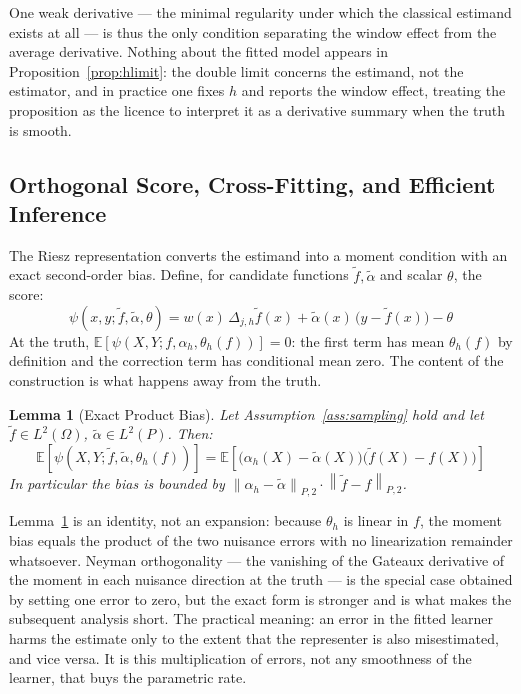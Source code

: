 \documentclass[12pt,a4paper]{article}
\numberwithin{equation}{section}
\theoremstyle{plain}
\newtheorem{lemma}{Lemma}
\theoremstyle{definition}
\newcommand{\norm}[1]{\left\| #1 \right\|}
\newcommand{\E}{\mathbb{E}}
\newcommand{\Dh}{\Delta_{j,h}}
\newcommand{\Ptwo}[1]{\norm{#1}_{P,2}}
\begin{document}
	One weak derivative --- the minimal regularity under which the classical estimand
	exists at all --- is thus the only condition separating the window effect from the
	average derivative. Nothing about the fitted model appears in
	Proposition~\ref{prop:hlimit}: the double limit concerns the estimand, not the
	estimator, and in practice one fixes $h$ and reports the window effect, treating the
	proposition as the licence to interpret it as a derivative summary when the truth is
	smooth.
	
	
	\subsection{Orthogonal Score, Cross-Fitting, and Efficient Inference}
	\label{sec:inference}
	
	The Riesz representation converts the estimand into a moment condition with an
	exact second-order bias. Define, for candidate functions
	$\tilde{f}, \tilde{\alpha}$ and scalar $\theta$, the score:
	\begin{equation}
		\psi(x, y; \tilde{f}, \tilde{\alpha}, \theta)
		= w(x)\, \Dh \tilde{f}(x)
		+ \tilde{\alpha}(x)\,\bigl(y - \tilde{f}(x)\bigr) - \theta
		\label{eq:score}
	\end{equation}
	At the truth, $\E[\psi(X, Y; f, \alpha_h, \theta_h(f))] = 0$: the first term has
	mean $\theta_h(f)$ by definition and the correction term has conditional mean zero.
	The content of the construction is what happens away from the truth.
	
	\begin{lemma}[Exact Product Bias]
		\label{lem:orth}
		Let Assumption~\ref{ass:sampling} hold and let
		$\tilde{f} \in L^2(\Omega)$, $\tilde{\alpha} \in L^2(P)$. Then:
		\begin{equation}
			\E\left[\psi(X, Y; \tilde{f}, \tilde{\alpha}, \theta_h(f))\right]
			= \E\left[\bigl(\alpha_h(X) - \tilde{\alpha}(X)\bigr)
			\bigl(\tilde{f}(X) - f(X)\bigr)\right]
		\end{equation}
		In particular the bias is bounded by
		$\Ptwo{\alpha_h - \tilde{\alpha}} \cdot \Ptwo{\tilde{f} - f}$.
	\end{lemma}
	
	Lemma~\ref{lem:orth} is an identity, not an expansion: because $\theta_h$ is linear
	in $f$, the moment bias equals the product of the two nuisance errors with no
	linearization remainder whatsoever. Neyman orthogonality --- the vanishing of the
	Gateaux derivative of the moment in each nuisance direction at the truth
	\citep{chernozhukov2018dml} --- is the special case obtained by setting one error to
	zero, but the exact form is stronger and is what makes the subsequent analysis
	short. The practical meaning: an error in the fitted learner harms the estimate only
	to the extent that the representer is also misestimated, and vice versa. It is this
	multiplication of errors, not any smoothness of the learner, that buys the
	parametric rate.
	
\end{document}
